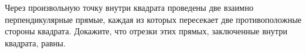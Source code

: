 \begin{ex}
	\begin{condition}
		Через произвольную точку внутри квадрата проведены две взаимно перпендикулярные прямые, каждая из которых пересекает две противоположные стороны квадрата. Докажите, что отрезки этих прямых, заключенные внутри квадрата, равны.
	\end{condition}
\end{ex}